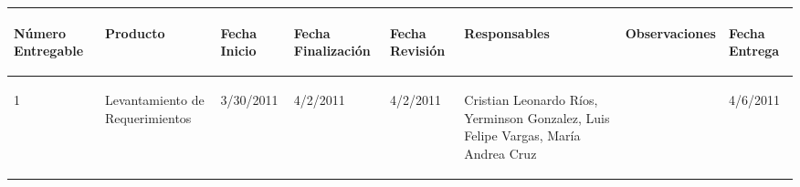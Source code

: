 %
%
\begin{center}
 \scriptsize
\begin{longtable}{|p{}|p{}|p{}|p{}|p{}|p{}|p{}|p{}|}
\hline
{\begin{center}\bf Número Entregable\end{center}} & 
{\begin{center}\bf Producto\end{center}} & 
{\begin{center}\bf Fecha Inicio\end{center}} & 
{\begin{center}\bf Fecha Finalización\end{center}} & 
{\begin{center}\bf Fecha Revisión\end{center}} & 
{\begin{center}\bf Responsables\end{center}} & 
{\begin{center}\bf Observaciones\end{center}} & 
{\begin{center}\bf Fecha Entrega\end{center}}\\
\hline
		
{\begin{center} 1 \end{center}} & 
{\begin{center}Levantamiento de Requerimientos\end{center}} & 
{\begin{center}3/30/2011\end{center}} & 
{\begin{center}4/2/2011\end{center}} & 
{\begin{center}4/2/2011\end{center}} & 
{\begin{center}Cristian Leonardo Ríos, Yerminson Gonzalez, Luis Felipe Vargas, María Andrea Cruz\end{center}} & 
{} & 
{\begin{center}4/6/2011\end{center}}\\
\hline


\end{longtable}
\end{center}
